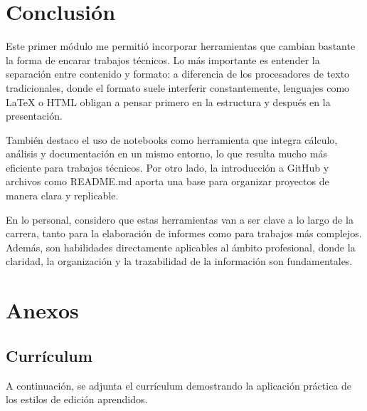 \documentclass[runningheads]{llncs}
\begin{document}
\section{Conclusión}

Este primer módulo me permitió incorporar herramientas que cambian bastante la forma de encarar trabajos técnicos. Lo más importante es entender la separación entre contenido y formato: a diferencia de los procesadores de texto tradicionales, donde el formato suele interferir constantemente, lenguajes como LaTeX o HTML obligan a pensar primero en la estructura y después en la presentación.

También destaco el uso de notebooks como herramienta que integra cálculo, análisis y documentación en un mismo entorno, lo que resulta mucho más eficiente para trabajos técnicos. Por otro lado, la introducción a GitHub y archivos como README.md aporta una base para organizar proyectos de manera clara y replicable.

En lo personal, considero que estas herramientas van a ser clave a lo largo de la carrera, tanto para la elaboración de informes como para trabajos más complejos. Además, son habilidades directamente aplicables al ámbito profesional, donde la claridad, la organización y la trazabilidad de la información son fundamentales.

\section{Anexos}

\subsection{Currículum}
A continuación, se adjunta el currículum demostrando la aplicación práctica de los estilos de edición aprendidos.





\end{document}
